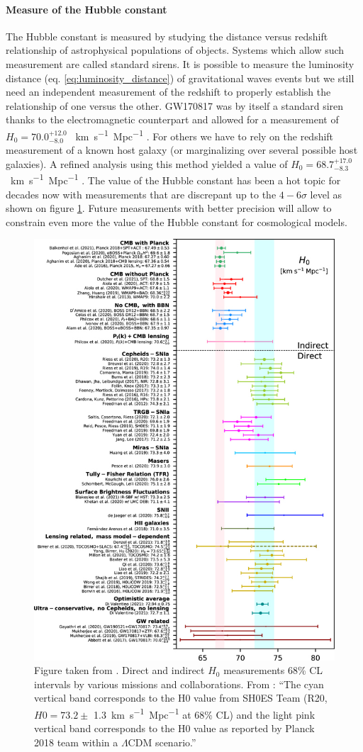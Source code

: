 \paragraph*{Measure of the Hubble constant}
\label{sec:H0}
The Hubble constant is measured by studying the distance versus redshift relationship of astrophysical populations of objects.
Systems which allow such measurement are called standard sirens.
It is possible to measure the luminosity distance (eq. \ref{eq:luminosity_distance}) of gravitational waves events but we still need an independent measurement of the redshift to properly establish the relationship of one versus the other.
GW170817 was by itself a standard siren thanks to the electromagnetic counterpart and allowed for a measurement of $H_0 = 70.0^{+12.0}_{-8.0}$ \SI{}{km.s^{-1}.Mpc^{-1}} \cite{H0_gw170817}.
For others we have to rely on the redshift measurement of a known host galaxy (or marginalizing over several possible host galaxies).
A refined analysis using this method yielded a value of $H_0 = 68.7^{+17.0}_{-8.3}$ \SI{}{km.s^{-1}.Mpc^{-1}} \cite{H0_LVK}.
The value of the Hubble constant has been a hot topic for decades now with measurements that are discrepant up to the $4-6\sigma$ level \cite{H0_1} as shown on figure \ref{fig:H0}.
Future measurements with better precision will allow to constrain even more the value of the Hubble constant for cosmological models.
%
\begin{figure}
  \centering
  \includegraphics[width=0.7\linewidth]{sectionGW/measurementH0.jpg}
  \caption{Figure taken from \cite{H0_1}. Direct and indirect $H_0$ measurements 68\% CL intervals by various missions and collaborations. From \cite{H0_1}: ``The cyan vertical band corresponds to the H0 value from SH0ES Team \cite{shoes} (R20, $H0 = 73.2 \pm$ \SI{1.3}{km.s^{-1}.Mpc^{-1}} at 68\% CL) and the light pink
vertical band corresponds to the H0 value as reported by Planck 2018 team \cite{Planck_2018} within a $\Lambda$CDM scenario.''}
  \label{fig:H0}
\end{figure}
%

